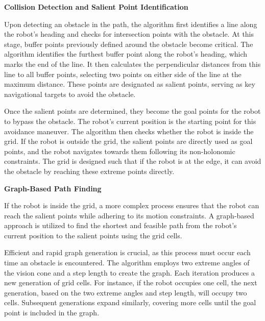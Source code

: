 \textbf{Collision Detection and Salient Point Identification}


Upon detecting an obstacle in the path, the algorithm first identifies a line along the robot’s heading and checks for intersection points with the obstacle. At this stage, buffer points previously defined around the obstacle become critical. The algorithm identifies the furthest buffer point along the robot's heading, which marks the end of the line. It then calculates the perpendicular distances from this line to all buffer points, selecting two points on either side of the line at the maximum distance. These points are designated as salient points, serving as key navigational targets to avoid the obstacle.

\vspace*{6mm}  

Once the salient points are determined, they become the goal points for the robot to bypass the obstacle. The robot's current position is the starting point for this avoidance maneuver. The algorithm then checks whether the robot is inside the grid. If the robot is outside the grid, the salient points are directly used as goal points, and the robot navigates towards them following its non-holonomic constraints. The grid is designed such that if the robot is at the edge, it can avoid the obstacle by reaching these extreme points directly.

\vspace*{6mm}  

\textbf{Graph-Based Path Finding}

If the robot is inside the grid, a more complex process ensures that the robot can reach the salient points while adhering to its motion constraints. A graph-based approach is utilized to find the shortest and feasible path from the robot's current position to the salient points using the grid cells.

\vspace*{6mm}  

Efficient and rapid graph generation is crucial, as this process must occur each time an obstacle is encountered. The algorithm employs two extreme angles of the vision cone and a step length to create the graph. Each iteration produces a new generation of grid cells. For instance, if the robot occupies one cell, the next generation, based on the two extreme angles and step length, will occupy two cells. Subsequent generations expand similarly, covering more cells until the goal point is included in the graph.

